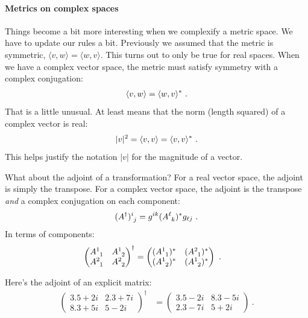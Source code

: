 \documentclass[12pt, oneside]{report}    %
\begin{document}
\paragraph{Metrics on complex spaces}
Things become a bit more interesting when we complexify a metric space. We have to update our rules a bit. Previously we assumed that the metric is symmetric, $\langle v, w\rangle = \langle w, v\rangle$. This turns out to only be true for real spaces. When we have a complex vector space, the metric must satisfy symmetry with a complex conjugation:
\begin{align}
    \langle v, w \rangle = \langle w, v \rangle^* \ .
    \label{eq:complex:metric:star}
\end{align}
That is a little unusual. At least means that the norm (length squared) of a complex vector is real:
\begin{align}
    |v|^2 = \langle v, v \rangle = \langle v, v \rangle^* \ .
\end{align}
This helps justify the notation $|v|$ for the magnitude of a vector. 

What about the adjoint of a transformation? For a real vector space, the adjoint is simply the transpose. For a complex vector space, the adjoint is the transpose \emph{and} a complex conjugation on each component:
\begin{align}
    (A^\dag)\aij{i}{j} = g^{ik}(A\aij{\ell}{k})^*g_{\ell j} \ .
\end{align}
In terms of components:
\begin{align}
    \begin{pmatrix}
        A\aij 11 & A\aij 12 \\
        A\aij 21 & A\aij 22 
    \end{pmatrix}^\dag &= 
    \begin{pmatrix}
        (A\aij 11)^* & (A\aij 21)^* \\
        (A\aij 12)^* & (A\aij 12 )^*
    \end{pmatrix} \ .
\end{align}
\begin{example}
Here's the adjoint of an explicit matrix:
\begin{align}
\begin{pmatrix}
        3.5 +2i & 2.3+7i \\
        8.3 + 5i & 5-2i
    \end{pmatrix}^\dag &= 
    \begin{pmatrix}
        3.5 -2i &  8.3 - 5i\\
        2.3 -7i & 5 +2i
    \end{pmatrix} \ .
\end{align}
\end{example}
\end{document}
